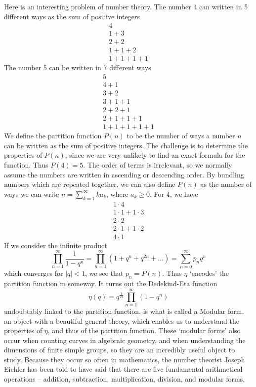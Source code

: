 Here is an interesting problem of number theory. The number 4 can written in 5 different ways as the sum of positive integers
%
\begin{align*}
    4\\
    1 + 3\\
    2 + 2\\
    1 + 1 + 2\\
    1 + 1 + 1 + 1
\end{align*}
%
The number 5 can be written in 7 different ways
%
\begin{align*}
    5\\
    4 + 1\\
    3 + 2\\
    3 + 1 + 1\\
    2 + 2 + 1\\
    2 + 1 + 1 + 1\\
    1 + 1 + 1 + 1 + 1
\end{align*}
%
We define the partition function $P(n)$ to be the number of ways a number $n$ can be written as the sum of positive integers. The challenge is to determine the properties of $P(n)$, since we are very unlikely to find an exact formula for the function. Thus $P(4) = 5$. The order of terms is irrelevant, so we normally assume the numbers are written in ascending or descending order. By bundling numbers which are repeated together, we can also define $P(n)$ as the number of ways we can write $n = \sum_{k = 1}^\infty k a_k$, where $a_k \geq 0$. For $4$, we have
%
\begin{align*}
    1 \cdot 4\\
    1 \cdot 1 + 1 \cdot 3\\
    2 \cdot 2\\
    2 \cdot 1 + 1 \cdot 2\\
    4 \cdot 1
\end{align*}
%
If we consider the infinite product
%
\[ \prod_{n = 1}^\infty \frac{1}{1 - q^n} = \prod_{n = 1}^\infty (1 + q^n + q^{2n} + \dots) = \sum_{n = 0}^\infty p_n q^n \]
%
which converges for $|q| < 1$, we see that $p_n = P(n)$. Thus $\eta$ `encodes' the partition function in someway. It turns out the Dedekind-Eta function
%
\[ \eta(q) = q^{\frac{1}{24}} \prod_{n = 1}^\infty (1 - q^n) \]
%
undoubtably linked to the partition function, is what is called a Modular form, an object with a beautiful general theory, which enables us to understand the properties of $\eta$, and thus of the partition function. These `modular forms' also occur when counting curves in algebraic geometry, and when understanding the dimensions of finite simple groups, so they are an incredibly useful object to study. Because they occur so often in mathematics, the number theorist Joseph Eichler has been told to have said that there are five fundamental arithmetical operations -- addition, subtraction, multiplication, division, and modular forms.

